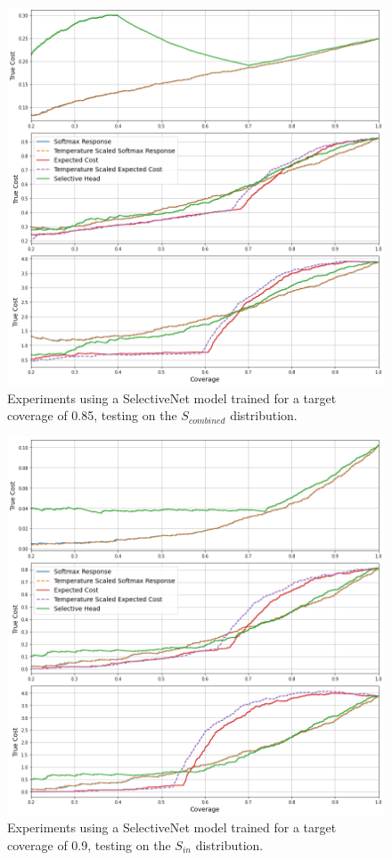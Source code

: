 \begin{figure}[H]
	\includegraphics[width=\textwidth]{images/binary/sn0.85_combine_distribution.png}
	\caption*{Experiments using a SelectiveNet model trained for a target coverage of 0.85, testing on the $S_{combined}$ distribution.}
\end{figure}

\begin{figure}[H]
	\includegraphics[width=\textwidth]{images/binary/sn0.9_in_distribution.png}
	\caption*{Experiments using a SelectiveNet model trained for a target coverage of 0.9, testing on the $S_{in}$ distribution.}
\end{figure}


